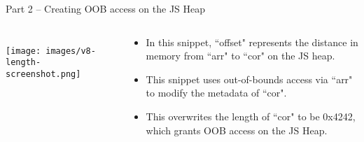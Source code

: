 \begin{frame}{Part 2 -- Creating OOB access on the JS Heap}
    \begin{columns}
        \begin{column}{0.5\textwidth}
            \inputminted[]{js}{code/exploit-2.tex}
            \texttt{[image: images/v8-length-screenshot.png]}
        \end{column}
        \begin{column}{0.5\textwidth}
            \begin{itemize}
                \item In this snippet, ``offset" represents the distance in memory from ``arr" to ``cor" on the JS heap. 
                \item This snippet uses out-of-bounds access via ``arr" to modify the metadata of ``cor".
                \item This overwrites the length of ``cor" to be 0x4242, which grants OOB access on the JS Heap. 
            \end{itemize}
        \end{column}
    \end{columns}
\end{frame}

